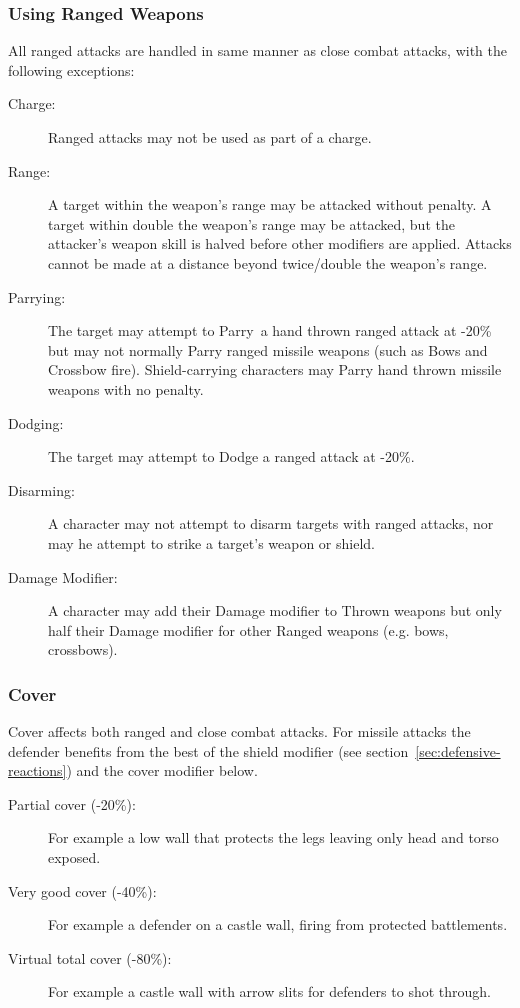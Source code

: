 \subsubsection{Using Ranged Weapons}
All ranged attacks are handled in same manner as close combat attacks, with the following exceptions: 
\begin{description}
\item[Charge:] Ranged attacks may not be used as part of a charge.
\item[Range:] A target within the weapon’s range may be attacked without penalty. A target within double the weapon’s range may be attacked, but the attacker’s weapon skill is halved before other modifiers are applied. Attacks cannot be made at a distance beyond twice/double the weapon’s range.
\item[Parrying:] The target may attempt to Parry a hand thrown ranged attack at -20\% but may not normally Parry ranged missile weapons (such as Bows and Crossbow fire). Shield-carrying characters may Parry hand thrown missile weapons with no penalty.
\item[Dodging:] The target may attempt to Dodge a ranged attack at -20\%.
\item[Disarming:] A character may not attempt to disarm targets with ranged attacks, nor may he attempt to strike a target’s weapon or shield.
\item[Damage Modifier:] A character may add their Damage modifier to Thrown weapons but only half their Damage modifier for other Ranged weapons (e.g. bows, crossbows).

\end{description}

\subsubsection{Cover}
Cover affects both ranged and close combat attacks. For missile attacks the defender benefits from the best of the shield modifier (see section~\ref{sec:defensive-reactions}) and the cover modifier below.

\begin{description}
	\item[Partial cover (-20\%):] For example a low wall that protects the legs leaving only head and torso exposed.
	\item[Very good cover (-40\%):] For example a defender on a castle wall, firing from protected battlements.
	\item[Virtual total cover (-80\%):] For example a castle wall with arrow slits for defenders to shot through.
\end{description}


